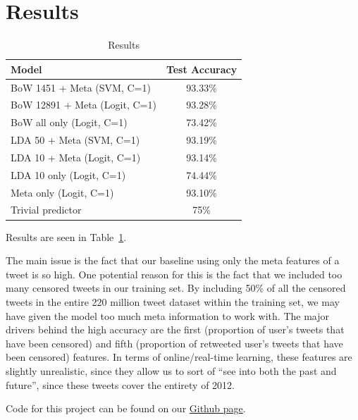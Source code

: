 \documentclass{sig-alternate-05-2015}
\begin{document}
\section{Results} \label{sec:res}
\begin{table}
  \centering
  \begin{tabular}{l|c}
    Model & Test Accuracy \\
    \hline 
    BoW 1451 + Meta (SVM, C=1) & 93.33\% \\
    BoW 12891 + Meta (Logit, C=1) & 93.28\% \\
    BoW all only (Logit, C=1) & 73.42\% \\
    LDA 50 + Meta (SVM, C=1) & 93.19\% \\
    LDA 10 + Meta (Logit, C=1) & 93.14\% \\
    LDA 10 only (Logit, C=1) & 74.44\% \\
    Meta only (Logit, C=1) & 93.10\% \\
    Trivial predictor & 75\%
  \end{tabular}
  \caption{Results}
  \label{tab:results}
\end{table}
Results are seen in Table~\ref{tab:results}. 

The main issue is the fact that our baseline using only the meta features of a tweet is so high. One potential reason for this is the fact that we included too many censored tweets in our training set. By including 50\% of all the censored tweets in the entire 220 million tweet dataset within the training set, we may have given the model too much meta information to work with. The major drivers behind the high accuracy are the first (proportion of user's tweets that have been censored) and fifth (proportion of retweeted user's tweets that have been censored) features. In terms of online/real-time learning, these features are slightly unrealistic, since they allow us to sort of ``see into both the past and future'', since these tweets cover the entirety of 2012. 




\appendix
Code for this project can be found on our \href{https://github.com/brtsay/CSE190_Assignment2}{Github page}.
\end{document}
